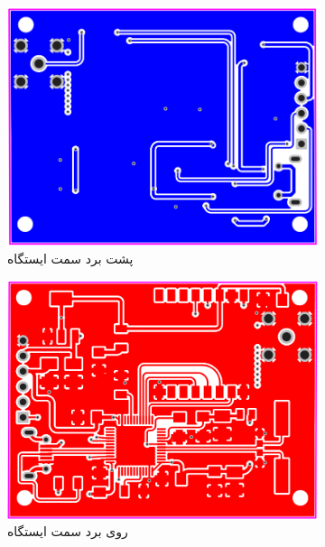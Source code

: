 \begin{figure}[!h]
	\begin{subfigure}[b]{0.5\textwidth}
		\includegraphics[width=\linewidth]{Assets/receiverBack.png}
		\caption{پشت برد سمت ایستگاه}
		\label{fig:}
	\end{subfigure}
	\begin{subfigure}[b]{0.5\textwidth}
		\includegraphics[width=\linewidth]{Assets/receiverFront.png}
		\caption{روی برد سمت ایستگاه}
		\label{fig:}
	\end{subfigure}
	\begin{subfigure}[b]{0.5\textwidth}

\end{subfigure}
\end{figure}

